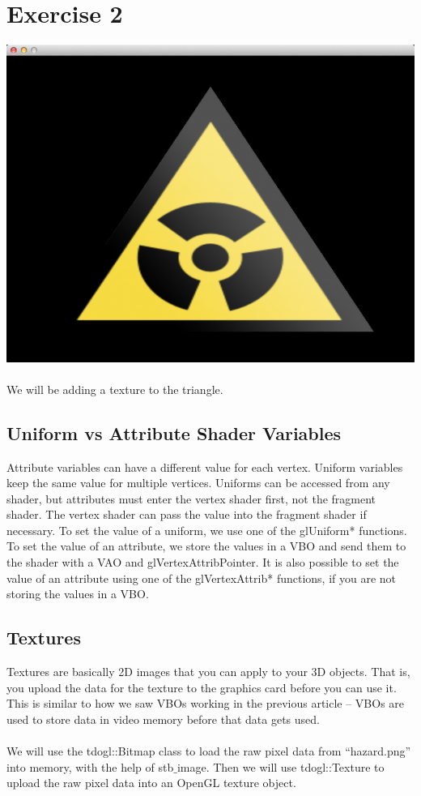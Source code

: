 \documentclass{article}
\begin{document}
\section{Exercise 2}
\includegraphics[scale=0.6]{3.png}\\\\
We will be adding a texture to the triangle.

\subsection{Uniform vs Attribute Shader Variables}
Attribute variables can have a different value for each vertex. Uniform variables keep the same value for multiple vertices. Uniforms can be accessed from any shader, but attributes must enter the vertex shader first, not the fragment shader. The vertex shader can pass the value into the fragment shader if necessary. To set the value of a uniform, we use one of the glUniform* functions. To set the value of an attribute, we store the values in a VBO and send them to the shader with a VAO and glVertexAttribPointer. It is also possible to set the value of an attribute using one of the glVertexAttrib* functions, if you are not storing the values in a VBO.\\
\subsection{Textures}
Textures are basically 2D images that you can apply to your 3D objects.  That is, you upload the data for the texture to the graphics card before you can use it. This is similar to how we saw VBOs working in the previous article – VBOs are used to store data in video memory before that data gets used.\\\\
We will use the tdogl::Bitmap class to load the raw pixel data from “hazard.png” into memory, with the help of stb$\_$image. Then we will use tdogl::Texture to upload the raw pixel data into an OpenGL texture object.\\
\end{document}
